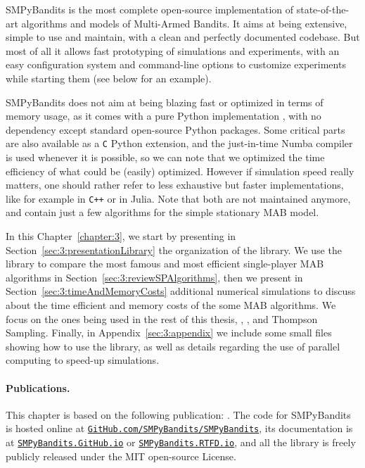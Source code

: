 SMPyBandits is the most complete open-source implementation of state-of-the-art algorithms and models of Multi-Armed Bandits.
It aims at being extensive, simple to use and maintain, with a clean and perfectly documented codebase. But most of all it allows fast prototyping of simulations and experiments, with an easy configuration system and command-line options to customize experiments while starting them (see below for an example).

SMPyBandits does not aim at being blazing fast or optimized in terms of memory usage, as it comes with a pure Python implementation \cite{python}, with no dependency except standard open-source Python packages.
Some critical parts are also available as a \texttt{C} Python extension, and the just-in-time Numba compiler \cite{numba} is used whenever it is possible, so we can note that we optimized the time efficiency of what could be (easily) optimized.
However if simulation speed really matters, one should rather refer to less exhaustive but faster implementations, like for example \cite{TorLibbandit} in \texttt{C++} or \cite{VishMABjl} in Julia. Note that both are not maintained anymore, and contain just a few algorithms for the simple stationary MAB model.

In this Chapter~\ref{chapter:3}, we start by presenting in Section~\ref{sec:3:presentationLibrary} the organization of the library.
We use the library to compare the most famous and most efficient single-player MAB algorithms in Section~\ref{sec:3:reviewSPAlgorithms},
then we present in Section~\ref{sec:3:timeAndMemoryCosts} additional numerical simulations to discuss about the time efficient and memory costs of the some MAB algorithms. We focus on the ones being used in the rest of this thesis, \UCB, \klUCB, and Thompson Sampling.
%
Finally, in Appendix~\ref{sec:3:appendix} we include some small files showing how to use the library, as well as details regarding the use of parallel computing to speed-up simulations.


\paragraph{Publications.}
%
This chapter is based on the following publication: \cite{SMPyBanditsJMLR}.
The code for SMPyBandits is hosted online at \texttt{\href{https://GitHub.com/SMPyBandits/SMPyBandits/}{GitHub.com/SMPyBandits/SMPyBandits}}, its documentation is at \texttt{\href{https://SMPyBandits.GitHub.io/}{SMPyBandits.GitHub.io}} or \texttt{\href{https://SMPyBandits.RTFD.io/}{SMPyBandits.RTFD.io}}, and all the library is freely publicly released under the MIT open-source License.


